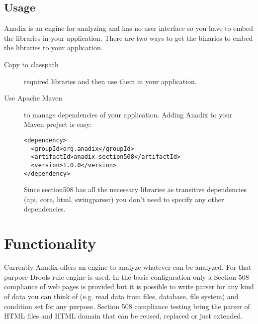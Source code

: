\documentclass{report}
\begin{document}
\section{Usage}
Anadix is an engine for analyzing and has no user interface so you have to embed
the libraries in your application. There are two ways to get the binaries to
embed the libraries to your application.
\begin{description}
  \item[Copy to classpath] required libraries and then use them in your
  application.
  \item[Use Apache Maven] to manage dependencies of your application. Adding Anadix to your Maven project is easy:
    \begin{verbatim}
<dependency>
  <groupId>org.anadix</groupId>
  <artifactId>anadix-section508</artifactId>
  <version>1.0.0</version>
</dependency>
    \end{verbatim}
  Since section508 has all the necessary libraries as transitive dependencies
  (api, core, html, swingparser) you don't need to specify any other
  dependencies.
\end{description}

\chapter{Functionality}
Currently Anadix offers an engine to analyze whatever can be analyzed. For that
purpose Drools rule engine is used. In the basic configuration only a Section
508 compliance of web pages is provided but it is possible to write parser for
any kind of data you can think of (e.g. read data from files, database,
file system) and condition set for any purpose. Section 508 compliance testing
bring the parser of HTML files and HTML domain that can be reused, replaced or
just extended.
\end{document}
